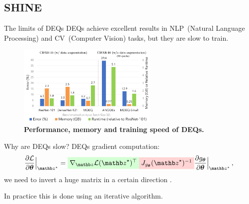 \subsection{SHINE}
\begin{frame}{The limits of DEQs}
    DEQs achieve excellent results in NLP~(Natural Language Processing) and CV~(Computer Vision) tasks, but they are slow to train.

    \begin{figure}
        \centering
        \includegraphics[width=0.6\textwidth]{Figures/shine_figures/deq_memory.png}
        \caption{\textbf{Performance, memory and training speed of DEQs.}~\citep{Bai2020MultiscaleModels}}
    \end{figure}
\end{frame}

\begin{frame}{Why are DEQs slow?}
    DEQs gradient computation:
    \begin{equation*}
        \frac{\partial \mathcal{L}}{\partial \thetab}\Bigr|_{\zb^\star} = \highlight{green}{$\nabla_\zb \mathcal{L}(\zb^\star)^\top$} \highlight{red}{$J_{g_{\thetab}}(\zb^\star)^{-1}$} \frac{\partial g_{\thetab}}{\partial \thetab}\Bigr|_{\zb^\star} \, ,
    \end{equation*}
    we need to invert a huge matrix  in a certain direction .
    \pause

    In practice this is done using an iterative algorithm.
\end{frame}

